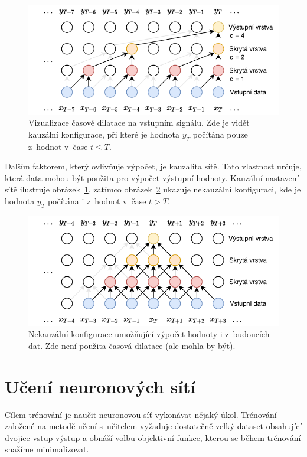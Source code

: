 \begin{figure}[H]
    \centering
    \includegraphics[scale=1.1]{obrazky-figures/causal_dilation.pdf}
    \caption{\label{fig:dilation_factor}Vizualizace časové dilatace na vstupním signálu. Zde je vidět kauzální konfigurace, při které je hodnota $y_T$ počítána pouze z~hodnot v~čase $t \leq T$.}
\end{figure}

Dalším faktorem, který ovlivňuje výpočet, je kauzalita sítě. Tato vlastnost určuje, která data mohou být použita pro výpočet výstupní hodnoty. Kauzální nastavení sítě ilustruje obrázek~\ref{fig:dilation_factor}, zatímco obrázek~\ref{fig:noncausal} ukazuje nekauzální konfiguraci, kde je hodnota $y_T$ počítána i z~hodnot v~čase $t > T$.

\begin{figure}[H]
    \centering
    \includegraphics[scale=1.1]{obrazky-figures/non-causal.pdf}
    \caption{\label{fig:noncausal}Nekauzální konfigurace umožňující výpočet hodnoty i z~budoucích dat. Zde není použita časová dilatace (ale mohla by být).}
\end{figure}

\section{Učení neuronových sítí}
Cílem trénování je naučit neuronovou síť vykonávat nějaký úkol. Trénování založené na metodě učení s~učitelem vyžaduje dostatečně velký dataset obsahující dvojice vstup-výstup a obnáší volbu objektivní funkce, kterou se během trénování snažíme minimalizovat. 

